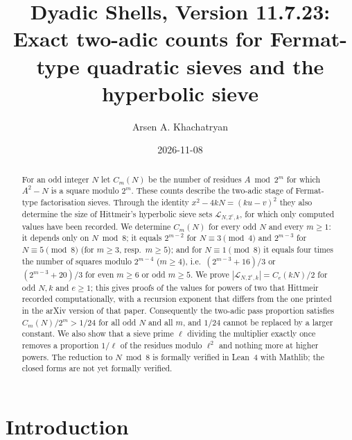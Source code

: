 \documentclass[11pt]{amsart}
\title[Exact two-adic counts for the hyperbolic sieve]{Dyadic Shells, Version 11.7.23:\\ Exact two-adic counts for Fermat-type quadratic sieves and the hyperbolic sieve}
\author{Arsen A. Khachatryan}
\date{2026-11-08}
\theoremstyle{remark}
\newcommand{\Lset}{\mathcal{L}}
\begin{document}
\begin{abstract}
For an odd integer $N$ let $C_m(N)$ be the number of residues $A \bmod 2^m$ for which $A^2-N$ is a square modulo $2^m$. These counts describe the two-adic stage of Fermat-type factorisation sieves. Through the identity $x^2-4kN=(ku-v)^2$ they also determine the size of Hittmeir's hyperbolic sieve sets $\Lset_{N,2^e,k}$, for which only computed values have been recorded. We determine $C_m(N)$ for every odd $N$ and every $m\ge1$: it depends only on $N\bmod 8$; it equals $2^{m-2}$ for $N\equiv3\pmod4$ and $2^{m-3}$ for $N\equiv5\pmod8$ (for $m\ge3$, resp.\ $m\ge5$); and for $N\equiv1\pmod8$ it equals four times the number of squares modulo $2^{m-4}$ ($m\ge4$), i.e.\ $(2^{m-3}+16)/3$ or $(2^{m-3}+20)/3$ for even $m\ge6$ or odd $m\ge5$. We prove $|\Lset_{N,2^e,k}|=C_e(kN)/2$ for odd $N,k$ and $e\ge1$; this gives proofs of the values for powers of two that Hittmeir recorded computationally, with a recursion exponent that differs from the one printed in the arXiv version of that paper. Consequently the two-adic pass proportion satisfies $C_m(N)/2^m>1/24$ for all odd $N$ and all $m$, and $1/24$ cannot be replaced by a larger constant. We also show that a sieve prime $\ell$ dividing the multiplier exactly once removes a proportion $1/\ell$ of the residues modulo $\ell^2$ and nothing more at higher powers. The reduction to $N\bmod8$ is formally verified in Lean~4 with Mathlib; the closed forms are not yet formally verified.
\end{abstract}

\maketitle

\section{Introduction}
\end{document}
